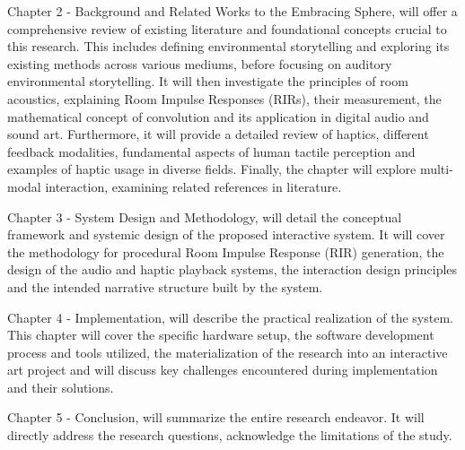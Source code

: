         Chapter 2 - Background and Related Works to the Embracing Sphere, will offer a comprehensive review of existing literature and foundational concepts crucial to this research. This includes defining environmental storytelling and exploring its existing methods across various mediums, before focusing on auditory environmental storytelling. It will then investigate the principles of room acoustics, explaining Room Impulse Responses (RIRs), their measurement, the mathematical concept of convolution and its application in digital audio and sound art. Furthermore, it will provide a detailed review of haptics, different feedback modalities, fundamental aspects of human tactile perception and examples of haptic usage in diverse fields. Finally, the chapter will explore multi-modal interaction, examining related references in literature.\par

        Chapter 3 - System Design and Methodology, will detail the conceptual framework and systemic design of the proposed interactive system. It will cover the methodology for procedural Room Impulse Response (RIR) generation, the design of the audio and haptic playback systems, the interaction design principles and the intended narrative structure built by the system.\par

        Chapter 4 - Implementation, will describe the practical realization of the system. This chapter will cover the specific hardware setup, the software development process and tools utilized, the materialization of the research into an interactive art project and will discuss key challenges encountered during implementation and their solutions.\par

        Chapter 5 - Conclusion, will summarize the entire research endeavor. It will directly address the research questions, acknowledge the limitations of the study.\par